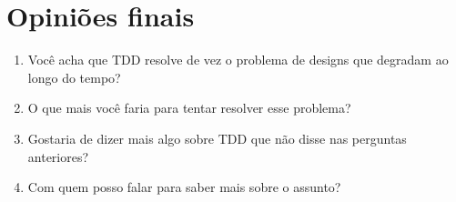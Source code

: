 \section{Opiniões finais}

\begin{enumerate}
	\item Você acha que TDD resolve de vez o problema de designs que degradam ao longo do tempo?
	\item O que mais você faria para tentar resolver esse problema?
	\item Gostaria de dizer mais algo sobre TDD que não disse nas perguntas anteriores?
	\item Com quem posso falar para saber mais sobre o assunto?
\end{enumerate}